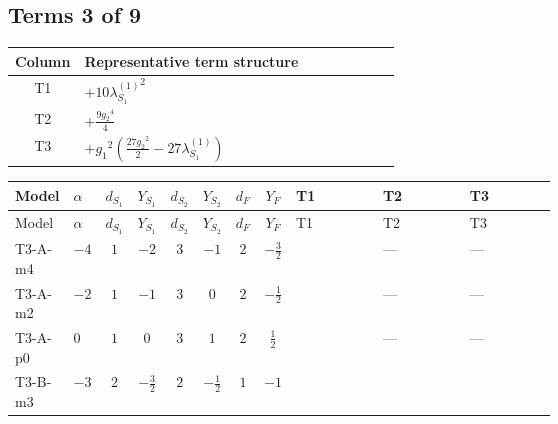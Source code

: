 \documentclass[8pt]{article}
\begin{document}
\begin{landscape}
\subsection*{Terms 3 of 9}
\begin{center}
\begin{tabular}{@{}c >{\raggedright\arraybackslash}p{0.82\linewidth}@{}}
\toprule
Column & Representative term structure \\
\midrule
T1 & \(\displaystyle +10 {\lambda_{S_1}^{(1)}}^2\) \\
\midrule
T2 & \(\displaystyle +\frac{9 {g_2}^4}{4}\) \\
\midrule
T3 & \(\displaystyle +{g_1}^2 \left(\frac{27 {g_2}^2}{2}-27 {\lambda_{S_1}^{(1)}}\right)\) \\
\midrule
\bottomrule
\end{tabular}
\end{center}
\smallskip
\tiny
\begin{longtable}{@{}llcccccc >{\raggedright\arraybackslash}p{0.21\linewidth} >{\raggedright\arraybackslash}p{0.21\linewidth} >{\raggedright\arraybackslash}p{0.21\linewidth}@{}}
\toprule
Model & $\alpha$ & $d_{S_1}$ & $Y_{S_1}$ & $d_{S_2}$ & $Y_{S_2}$ & $d_F$ & $Y_F$ & T1 & T2 & T3 \\
\midrule
\endfirsthead
\toprule
Model & $\alpha$ & $d_{S_1}$ & $Y_{S_1}$ & $d_{S_2}$ & $Y_{S_2}$ & $d_F$ & $Y_F$ & T1 & T2 & T3 \\
\midrule
\endhead
T3-A-m4 & $-4$ & $1$ & $-2$ & $3$ & $-1$ & $2$ & $-\frac{3}{2}$ & \scriptsize\adjustbox{max width=\linewidth}{$\begin{gathered} +10 {\lambda_{S_1}^{(1)}}^2\end{gathered}$} & --- & --- \\
\midrule
T3-A-m2 & $-2$ & $1$ & $-1$ & $3$ & $0$ & $2$ & $-\frac{1}{2}$ & \scriptsize\adjustbox{max width=\linewidth}{$\begin{gathered} +10 {\lambda_{S_1}^{(1)}}^2\end{gathered}$} & --- & --- \\
\midrule
T3-A-p0 & $0$ & $1$ & $0$ & $3$ & $1$ & $2$ & $\frac{1}{2}$ & \scriptsize\adjustbox{max width=\linewidth}{$\begin{gathered} +10 {\lambda_{S_1}^{(1)}}^2\end{gathered}$} & --- & --- \\
\midrule
T3-B-m3 & $-3$ & $2$ & $-\frac{3}{2}$ & $2$ & $-\frac{1}{2}$ & $1$ & $-1$ & \scriptsize\adjustbox{max width=\linewidth}{$\begin{gathered} +12 {\lambda_{S_1}^{(1)}}^2\end{gathered}$} & \scriptsize\adjustbox{max width=\linewidth}{$\begin{gathered} +\frac{9 {g_2}^4}{4}\end{gathered}$} & \scriptsize\adjustbox{max width=\linewidth}{$\begin{gathered} +{g_1}^2 \left(\frac{27 {g_2}^2}{2}-27 {\lambda_{S_1}^{(1)}}\right)\end{gathered}$} \\

\end{longtable}
\end{landscape}
\end{document}
